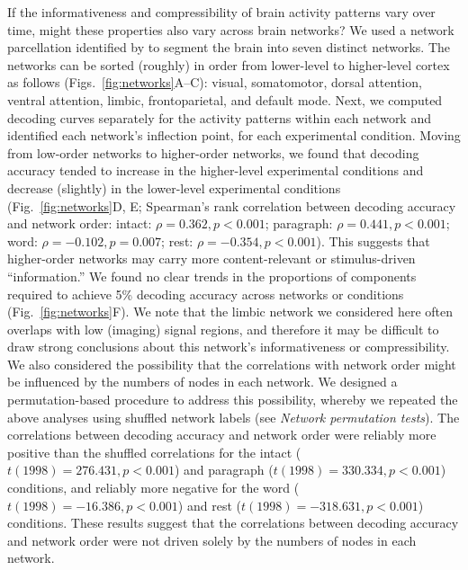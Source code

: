 \documentclass[english, 11pt]{article}
\begin{document}
If the informativeness and compressibility of brain activity patterns vary over
time, might these properties also vary across brain networks? We used a
network parcellation identified by \cite{YeoEtal11} to segment the brain into
seven distinct networks. The networks can be sorted (roughly) in order from
lower-level to higher-level cortex as follows (Figs.~\ref{fig:networks}A--C):
visual, somatomotor, dorsal attention, ventral attention, limbic,
frontoparietal, and default mode. Next, we computed decoding curves separately
for the activity patterns within each network and identified each network's
inflection point, for each experimental condition. Moving from low-order
networks to higher-order networks, we found that decoding accuracy tended to
increase in the higher-level experimental conditions and decrease (slightly) in
the lower-level experimental conditions (Fig.~\ref{fig:networks}D, E;
Spearman's rank correlation between decoding accuracy and network order:
intact: $\rho = 0.362, p < 0.001$; paragraph: $\rho = 0.441, p < 0.001$; word:
$\rho = -0.102, p = 0.007$; rest: $\rho = -0.354, p < 0.001$). This suggests
that higher-order networks may carry more content-relevant or stimulus-driven
``information.'' We found no clear trends in the proportions of components
required to achieve 5\% decoding accuracy across networks or conditions
(Fig.~\ref{fig:networks}F). We note that the limbic network we considered here
often overlaps with low (imaging) signal regions, and therefore it may be
difficult to draw strong conclusions about this network's informativeness or
compressibility. We also considered the possibility that the correlations with
network order might be influenced by the numbers of nodes in each network. We
designed a permutation-based procedure to address this possibility, whereby we
repeated the above analyses using shuffled network labels (see \textit{Network
permutation tests}). The correlations between decoding accuracy and network
order were reliably more positive than the shuffled correlations for the intact
($t(1998) = 276.431, p < 0.001$) and paragraph ($t(1998) = 330.334, p < 0.001$)
conditions, and reliably more negative for the word ($t(1998) = -16.386, p <
0.001$) and rest ($t(1998) = -318.631, p < 0.001$) conditions. These results
suggest that the correlations between decoding accuracy and network order were
not driven solely by the numbers of nodes in each network.
\end{document}
